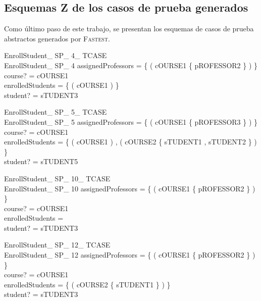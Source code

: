 \documentclass{article}
\begin{document}
\subsection*{Esquemas Z de los casos de prueba generados}

Como último paso de este trabajo, se presentan los esquemas de casos de prueba abstractos generados por \textsc{Fastest}.

\begin{schema}{EnrollStudent\_ SP\_ 4\_ TCASE}\\
 EnrollStudent\_ SP\_ 4 
\where
 assignedProfessors = \{ ( cOURSE1 \mapsto \{ pROFESSOR2 \} ) \} \\
 course? = cOURSE1 \\
 enrolledStudents = \{ ( cOURSE1 \mapsto \emptyset ) \} \\
 student? = sTUDENT3
\end{schema}


\begin{schema}{EnrollStudent\_ SP\_ 5\_ TCASE}\\
 EnrollStudent\_ SP\_ 5 
\where
 assignedProfessors = \{ ( cOURSE1 \mapsto \{ pROFESSOR3 \} ) \} \\
 course? = cOURSE1 \\
 enrolledStudents = \{ ( cOURSE1 \mapsto \emptyset ) , ( cOURSE2 \mapsto \{ sTUDENT1 , sTUDENT2 \} ) \} \\
 student? = sTUDENT5
\end{schema}


\begin{schema}{EnrollStudent\_ SP\_ 10\_ TCASE}\\
 EnrollStudent\_ SP\_ 10 
\where
 assignedProfessors = \{ ( cOURSE1 \mapsto \{ pROFESSOR2 \} ) \} \\
 course? = cOURSE1 \\
 enrolledStudents =~\emptyset \\
 student? = sTUDENT3
\end{schema}


\begin{schema}{EnrollStudent\_ SP\_ 12\_ TCASE}\\
 EnrollStudent\_ SP\_ 12 
\where
 assignedProfessors = \{ ( cOURSE1 \mapsto \{ pROFESSOR2 \} ) \} \\
 course? = cOURSE1 \\
 enrolledStudents = \{ ( cOURSE2 \mapsto \{ sTUDENT1 \} ) \} \\
 student? = sTUDENT3
\end{schema}
\end{document}
